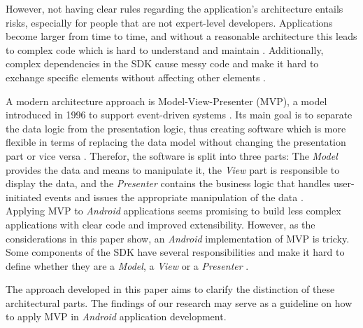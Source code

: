 However, not having clear rules regarding the application's architecture entails risks, especially for people that are not expert-level developers. Applications become larger from time to time, and without a reasonable architecture this leads to complex code which is hard to understand and maintain \cite{PassiveMVC, BallOfMud}. Additionally, complex dependencies in the SDK cause messy code and make it hard to exchange specific elements without affecting other elements \cite{PassiveMVC}.\\ 


A modern architecture approach is Model-View-Presenter (MVP), a model introduced in 1996 to support event-driven systems \cite{TaligentMVP}. Its main goal is to separate the data logic from the presentation logic, thus creating software which is more flexible in terms of replacing the data model without changing the presentation part or vice versa \cite{PassiveMVC}. Therefor, the software is split into three parts: The \emph{Model} provides the data and means to manipulate it, the \emph{View} part is responsible to display the data, and the \emph{Presenter} contains the business logic that handles user-initiated events and issues the appropriate manipulation of the data \cite{TaligentMVP}.\\


Applying MVP to \emph{Android} applications seems promising to build less complex applications with clear code and improved extensibility. However, as the considerations in this paper show, an \emph{Android} implementation of MVP is tricky. Some components of the SDK have several responsibilities and make it hard to define whether they are a \emph{Model}, a \emph{View} or a \emph{Presenter} \cite{PassiveMVC}. 

The approach developed in this paper aims to clarify the distinction of these architectural parts. The findings of our research may serve as a guideline on how to apply MVP in \emph{Android} application development.\\

